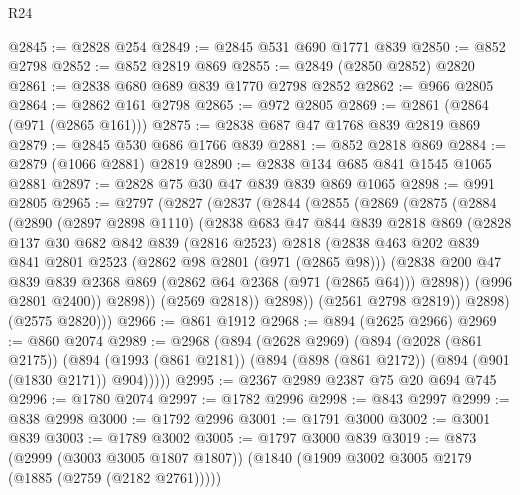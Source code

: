 \begin{lexlean}{R24}
\begin{coremodule}
@2845 := @2828 @254
@2849 := @2845 @531 @690 @1771 @839
@2850 := @852 @2798
@2852 := @852 @2819 @869
@2855 := @2849 (@2850 @2852) @2820
@2861 := @2838 @680 @689 @839 @1770 @2798 @2852
@2862 := @966 @2805
@2864 := @2862 @161 @2798
@2865 := @972 @2805
@2869 := @2861 (@2864 (@971 (@2865 @161)))
@2875 := @2838 @687 @47 @1768 @839 @2819 @869
@2879 := @2845 @530 @686 @1766 @839
@2881 := @852 @2818 @869
@2884 := @2879 (@1066 @2881) @2819
@2890 := @2838 @134 @685 @841 @1545 @1065 @2881
@2897 := @2828 @75 @30 @47 @839 @839 @869 @1065
@2898 := @991 @2805
@2965 := @2797
    (@2827
      (@2837
        (@2844
          (@2855
            (@2869
              (@2875
                (@2884
                  (@2890
                    (@2897 @2898 @1110)
                    (@2838
                      @683
                      @47
                      @844
                      @839
                      @2818
                      @869
                      (@2828
                        @137
                        @30
                        @682
                        @842
                        @839
                        (@2816 @2523)
                        @2818
                        (@2838
                          @463
                          @202
                          @839
                          @841
                          @2801
                          @2523
                          (@2862 @98 @2801 (@971 (@2865 @98)))
                          (@2838
                            @200
                            @47
                            @839
                            @839
                            @2368
                            @869
                            (@2862 @64 @2368 (@971 (@2865 @64)))
                            @2898))
                        (@996 @2801 @2400))
                      @2898))
                  (@2569 @2818))
                @2898))
            (@2561 @2798 @2819))
          @2898)
        (@2575 @2820)))
@2966 := @861 @1912
@2968 := @894 (@2625 @2966)
@2969 := @860 @2074
@2989 := @2968
    (@894
      (@2628 @2969)
      (@894
        (@2028 (@861 @2175))
        (@894 (@1993 (@861 @2181)) (@894 (@898 (@861 @2172)) (@894 (@901 (@1830 @2171)) @904)))))
@2995 := @2367 @2989 @2387 @75 @20 @694 @745
@2996 := @1780 @2074
@2997 := @1782 @2996
@2998 := @843 @2997
@2999 := @838 @2998
@3000 := @1792 @2996
@3001 := @1791 @3000
@3002 := @3001 @839
@3003 := @1789 @3002
@3005 := @1797 @3000 @839
@3019 := @873
    (@2999 (@3003 @3005 @1807 @1807))
    (@1840 (@1909 @3002 @3005 @2179 (@1885 (@2759 (@2182 @2761)))))

\end{coremodule}
\end{lexlean}
